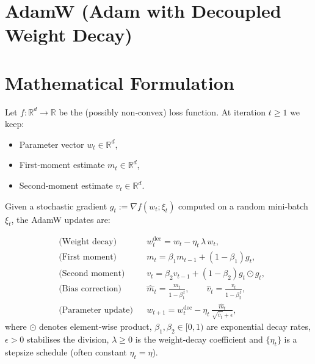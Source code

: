 \documentclass{article}
\newcommand{\RR}{\mathbb{R}}
\begin{document}
\section*{AdamW (Adam with Decoupled Weight Decay)}

\section*{Mathematical Formulation}
Let $f:\RR^{d}\rightarrow\RR$ be the (possibly non‑convex) loss function.  
At iteration $t\ge 1$ we keep:

\begin{itemize}
    \item Parameter vector $w_t\in\RR^{d}$,
    \item First‑moment estimate $m_t\in\RR^{d}$,
    \item Second‑moment estimate $v_t\in\RR^{d}$.
\end{itemize}

Given a stochastic gradient $g_t:=\nabla f(w_t;\xi_t)$ computed on a random mini‑batch $\xi_t$, the AdamW updates are:

\[
\begin{aligned}
    &\text{(Weight decay)} && w_t^{\text{dec}} = w_t - \eta_t \,\lambda\, w_t, \tag{1}\\[4pt]
    &\text{(First moment)} && m_t = \beta_1 m_{t-1} + (1-\beta_1) g_t, \tag{2}\\[4pt]
    &\text{(Second moment)}&& v_t = \beta_2 v_{t-1} + (1-\beta_2) g_t\odot g_t, \tag{3}\\[4pt]
    &\text{(Bias correction)}&& 
    \hat m_t = \frac{m_t}{1-\beta_1^{\,t}},\qquad 
    \hat v_t = \frac{v_t}{1-\beta_2^{\,t}},\tag{4}\\[4pt]
    &\text{(Parameter update)}&& 
    w_{t+1}= w_t^{\text{dec}} - \eta_t \,\frac{\hat m_t}{\sqrt{\hat v_t}+\epsilon}, \tag{5}
\end{aligned}
\]
where $\odot$ denotes element‑wise product, $\beta_1,\beta_2\in[0,1)$ are exponential decay rates, $\epsilon>0$ stabilises the division, $\lambda\ge0$ is the weight‑decay coefficient and $\{\eta_t\}$ is a stepsize schedule (often constant $\eta_t=\eta$).
\end{document}
